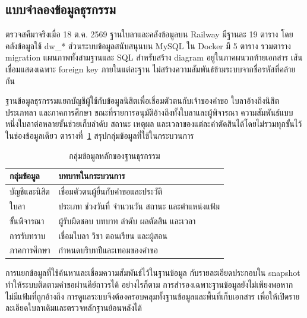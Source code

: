 \subsection{แบบจำลองข้อมูลธุรกรรม}
ตรวจสคีมาจริงเมื่อ 18 ต.ค. 2569 ฐานใบลาและคลังข้อมูลบน Railway มีฐานละ 19 ตาราง โดยคลังข้อมูลใช้ dw\_* ส่วนระบบข้อมูลสนับสนุนบน MySQL ใน Docker มี 5 ตาราง รวมตาราง migration แผนภาพทั้งสามฐานและ SQL สำหรับสร้าง diagram อยู่ในภาคผนวกท้ายเอกสาร เส้นเชื่อมแสดงเฉพาะ foreign key ภายในแต่ละฐาน ไม่สร้างความสัมพันธ์ข้ามระบบจากชื่อรหัสที่คล้ายกัน

ฐานข้อมูลธุรกรรมแยกบัญชีผู้ใช้กับข้อมูลนิสิตเพื่อเชื่อมตัวตนกับเจ้าของคำขอ ใบลาอ้างถึงนิสิต ประเภทลา และภาคการศึกษา ขณะที่รายการอนุมัติอ้างถึงทั้งใบลาและผู้พิจารณา ความสัมพันธ์แบบหนึ่งใบลาต่อหลายขั้นช่วยเก็บลำดับ สถานะ เหตุผล และเวลาของแต่ละคำตัดสินได้โดยไม่รวมทุกขั้นไว้ในช่องข้อมูลเดียว ตารางที่~\ref{tab:operational-model} สรุปกลุ่มข้อมูลที่ใช้ในกระบวนการ
\begin{table}[ht]
\caption{กลุ่มข้อมูลหลักของฐานธุรกรรม}\label{tab:operational-model}
\centering
\begin{tabularx}{\columnwidth}{|p{23mm}|X|}
\hline
กลุ่มข้อมูล & บทบาทในกระบวนการ \\ \hline
บัญชีและนิสิต & เชื่อมตัวตนผู้ยื่นกับคำขอและประวัติ \\ \hline
ใบลา & ประเภท ช่วงวันที่ จำนวนวัน สถานะ และตำแหน่งแฟ้ม \\ \hline
ขั้นพิจารณา & ผู้รับผิดชอบ บทบาท ลำดับ ผลตัดสิน และเวลา \\ \hline
การรับทราบ & เชื่อมใบลา วิชา ตอนเรียน และผู้สอน \\ \hline
ภาคการศึกษา & กำหนดบริบทปีและเทอมของคำขอ \\ \hline
\end{tabularx}
\end{table}
การแยกข้อมูลที่ใช้ค้นหาและเชื่อมความสัมพันธ์ไว้ในฐานข้อมูล กับรายละเอียดประกอบใน snapshot ทำให้ระบบติดตามคำขอผ่านคีย์ถาวรได้ อย่างไรก็ตาม การสำรองเฉพาะฐานข้อมูลยังไม่เพียงพอหากไม่มีแฟ้มที่ถูกอ้างถึง การดูแลระบบจึงต้องครอบคลุมทั้งฐานข้อมูลและพื้นที่เก็บเอกสาร เพื่อให้เปิดรายละเอียดใบลาเดิมและตรวจหลักฐานย้อนหลังได้
